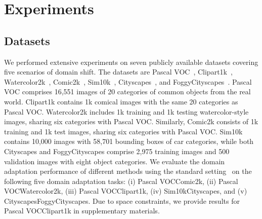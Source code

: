 \documentclass{bmvc2k}
\begin{document}
\section{Experiments}
\subsection{Datasets}
We performed extensive experiments on seven publicly available datasets covering five scenarios of domain shift. The datasets are Pascal VOC~\cite{everingham2010Pascal}, Clipart1k~\cite{inoue2018cross}, 
Watercolor2k~\cite{inoue2018cross}, 
Comic2k~\cite{inoue2018cross}, 
Sim10k~\cite{johnson2016driving}, Cityscapes~\cite{cordts2016cityscapes}, and FoggyCityscapes~\cite{sakaridis2018semantic}. Pascal VOC comprises 16,551 images of 20 categories of common objects from the real world. Clipart1k contains 1k comical images with the same 20 categories as Pascal VOC. Watercolor2k includes 1k training and 1k testing watercolor-style images, sharing six categories with Pascal VOC. Similarly, Comic2k consists of 1k training and 1k test images, sharing six categories with Pascal VOC. Sim10k contains 10,000 images with 58,701 bounding boxes of car categories, while both Cityscapes and FoggyCityscapes comprise 2,975 training images and 500 validation images with eight object categories. We evaluate the domain adaptation performance of different methods using the standard setting~\cite{saito2019strong, li2022cross} on the following five domain adaptation tasks: (i) Pascal VOCComic2k, (ii) Pascal VOCWatercolor2k, (iii) Pascal VOCClipart1k, (iv) Sim10kCityscapes, and (v) CityscapesFoggyCityscapes.
Due to space constraints, we provide results for Pascal VOCClipart1k in supplementary materials.
\end{document}
